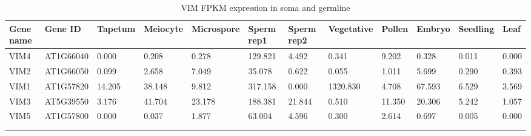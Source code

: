 \begin{landscape}
\begin{longtable}{ll|llllllll|ll}
Gene name & Gene ID & Tapetum & Meiocyte & Microspore & Sperm rep1 & Sperm rep2 & Vegetative & Pollen & Embryo & Seedling & Leaf \\ \hline
\endfirsthead
%
\endhead
%
VIM4 & AT1G66040 & 0.000  & 0.208  & 0.278  & 129.821 & 4.492  & 0.341    & 9.202  & 0.328  & 0.011 & 0.000 \\
VIM2 & AT1G66050 & 0.099  & 2.658  & 7.049  & 35.078  & 0.622  & 0.055    & 1.011  & 5.699  & 0.290 & 0.393 \\
VIM1 & AT1G57820 & 14.205 & 38.148 & 9.812  & 317.158 & 0.000  & 1320.830 & 4.708  & 67.593 & 6.529 & 3.569 \\
VIM3 & AT5G39550 & 3.176  & 41.704 & 23.178 & 188.381 & 21.844 & 0.510    & 11.350 & 20.306 & 5.242 & 1.057 \\
VIM5 & AT1G57800 & 0.000  & 0.037  & 1.877  & 63.004  & 4.596  & 0.300    & 2.614  & 0.697  & 0.005 & 0.000 \\
\caption{VIM FPKM expression in soma and germline} \\
\label{tab:VIM_expression}\\
\end{longtable}
\end{landscape}